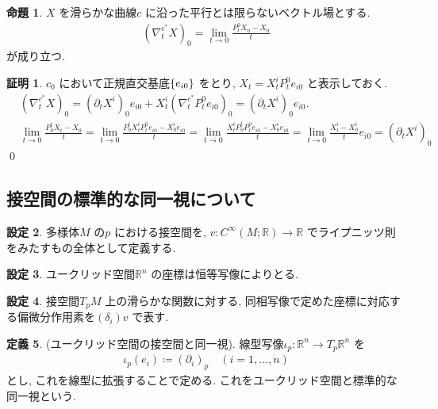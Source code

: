\documentclass[10pt, fleqn, label-section=none]{bxjsarticle}
\theoremstyle{definition}
\newtheorem{dfn}{定義}[section]
\newtheorem{prop}[dfn]{命題}
\newtheorem{setting}[dfn]{設定}
\newtheorem*{pf*}{証明}
\newcommand{\cbra}[1]{\mleft\{#1\mright\}}
\renewcommand{\;}{\, ; \,}
\begin{document}
\begin{prop}
$X$ を滑らかな曲線$c$ に沿った平行とは限らないベクトル場とする. 
\begin{align*} (\nabla^{c^*}_t X ) _0 =  \lim_{t \rightarrow 0} \frac{P^0_t X_0 - X_0}{ t } \end{align*}
が成り立つ. 
\end{prop}
\begin{pf*}
$c_{0}$ において正規直交基底$\cbra{e_{i0} }$ をとり, $X_t = X^i_t P^{0}_t e_{i0}  $ と表示しておく.  
\begin{align*} &(\nabla^{c^*}_t X ) _0 = (\partial_t X^i)_0 e_{i0} +  X^i_t (\nabla^{c^*}_t P^{0}_t e_{i0})_0  =  (\partial_t X^i)_0 e_{i0}. \\ 
&\lim_{t \rightarrow 0} \frac{P^t_0 X_t - X_0}{ t } = \lim_{t \rightarrow 0} \frac{P^t_0 X^i_t P^{0}_t e_{i0} - X^i_0 e_{i0}}{ t } =  \lim_{t \rightarrow 0} \frac{X^i_t P^t_0 P^{0}_t e_{i0} - X^i_0 e_{i0}}{ t } = \lim_{t \rightarrow 0} \frac{X^i_t - X^i_0}{t} e_{i0} = (\partial_t X^i)_0\end{align*}
\qed
\end{pf*}


\subsection{接空間の標準的な同一視について}

\begin{setting}
多様体$M$ の$p$ における接空間を, $v:C^\infty(M ; \mathbb R) \rightarrow \mathbb R$ でライプニッツ則をみたすもの全体として定義する. 
\end{setting}

\begin{setting}
ユークリッド空間$\mathbb R^n$ の座標は恒等写像によりとる. 
\end{setting}

\begin{setting}
接空間$T_pM$ 上の滑らかな関数に対する, 同相写像で定めた座標に対応する偏微分作用素を$(\delta_i)v$ で表す. 
\end{setting}

\begin{dfn}(ユークリッド空間の接空間と同一視). 線型写像$\iota_p : \mathbb R^n \rightarrow T_p \mathbb R^n$ を
\begin{align*} \iota_p (e_i) \coloneqq (\partial_i )_p  \quad (i = 1, \ldots , n)\end{align*}
とし, これを線型に拡張することで定める. これをユークリッド空間と標準的な同一視という. 
\end{dfn}
\end{document}
